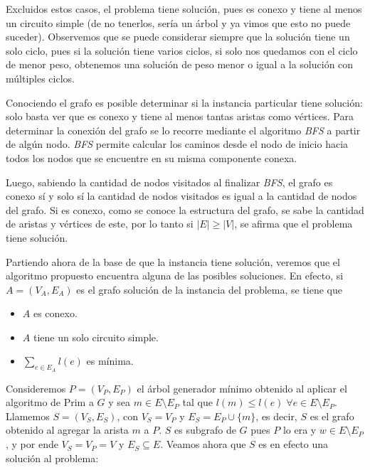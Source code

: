 Excluidos estos casos, el problema tiene solución, pues es conexo y tiene al
menos un circuito simple (de no tenerlos, sería un árbol y ya vimos que esto
no puede suceder). Observemos que se puede considerar siempre que la
solución tiene un solo ciclo, pues si la solución tiene varios ciclos, si
solo nos quedamos con el ciclo de menor peso, obtenemos una solución de peso
menor o igual a la solución con múltiples ciclos.

Conociendo el grafo es posible determinar si la instancia particular tiene
solución: solo basta ver que es conexo y tiene al menos tantas aristas como
vértices. Para determinar la conexión del grafo se lo recorre mediante el 
algoritmo \textit{BFS} a partir de algún nodo. \textit{BFS} permite calcular los
caminos desde el nodo de inicio hacia todos los nodos que se encuentre en su 
misma componente conexa. %

Luego, sabiendo la cantidad de nodos visitados al finalizar \textit{BFS}, 
el grafo es conexo sí y solo sí la cantidad de nodos visitados es igual a la 
cantidad de nodos del grafo. Si es conexo, como se conoce la estructura del grafo, 
se sabe la cantidad de aristas y vértices de este, por lo tanto si $|E| \geq |V|$, 
se afirma que el problema tiene solución.

Partiendo ahora de la base de que la instancia tiene solución, veremos
que el algoritmo propuesto encuentra alguna de las posibles soluciones. En
efecto, si $A = (V_A, E_A)$ es el grafo solución de la instancia del
problema, se tiene que

\begin{itemize}
  \item $A$ es conexo.

  \item $A$ tiene un solo circuito simple.

  \item $\sum\limits_{e \in E_A} l(e)$ es mínima.
\end{itemize}

Consideremos $P = (V_P, E_P)$ el árbol generador mínimo obtenido al aplicar
el algoritmo de Prim a $G$ y sea $m \in E \setminus E_P$ tal que $l(m) \leq
l(e) \; \forall e \in E \setminus E_P$. Llamemos $S = (V_S, E_S)$, con $V_S
= V_P$ y $E_S = E_P \cup \{m\}$, es decir, $S$ es el grafo obtenido al
agregar la arista $m$ a $P$. $S$ es subgrafo de $G$ pues $P$ lo era y $w \in
E \setminus E_P$, y por ende $V_S = V_P = V$ y $E_S \subseteq E$. Veamos
ahora que $S$ es en efecto una solución al problema:

